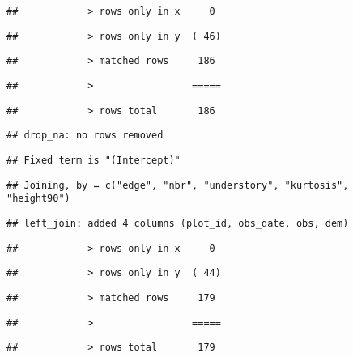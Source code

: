 \documentclass[
]{article}
\begin{document}
\begin{verbatim}
##            > rows only in x     0
\end{verbatim}

\begin{verbatim}
##            > rows only in y  ( 46)
\end{verbatim}

\begin{verbatim}
##            > matched rows     186
\end{verbatim}

\begin{verbatim}
##            >                 =====
\end{verbatim}

\begin{verbatim}
##            > rows total       186
\end{verbatim}

\begin{verbatim}
## drop_na: no rows removed
\end{verbatim}

\begin{verbatim}
## Fixed term is "(Intercept)"
\end{verbatim}

\begin{verbatim}
## Joining, by = c("edge", "nbr", "understory", "kurtosis", "height90")
\end{verbatim}

\begin{verbatim}
## left_join: added 4 columns (plot_id, obs_date, obs, dem)
\end{verbatim}

\begin{verbatim}
##            > rows only in x     0
\end{verbatim}

\begin{verbatim}
##            > rows only in y  ( 44)
\end{verbatim}

\begin{verbatim}
##            > matched rows     179
\end{verbatim}

\begin{verbatim}
##            >                 =====
\end{verbatim}

\begin{verbatim}
##            > rows total       179
\end{verbatim}
\end{document}
